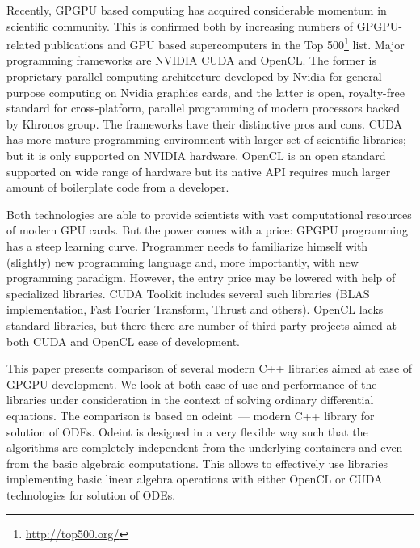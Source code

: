 \documentclass[1p]{elsarticle}
\begin{document}
Recently, GPGPU based computing has acquired considerable momentum in
scientific community. This is confirmed both by increasing numbers of
GPGPU-related publications and GPU based supercomputers in
the Top 500\footnote{\href{http://top500.org/}{http://top500.org/}} list. Major
programming frameworks are NVIDIA CUDA and OpenCL.  The former is proprietary
parallel computing architecture developed by Nvidia for general purpose
computing on Nvidia graphics cards, and the latter is open, royalty-free
standard for cross-platform, parallel programming of modern processors backed
by Khronos group. The frameworks have their distinctive pros and cons. CUDA has
more mature programming environment with larger set of scientific libraries;
but it is only supported on NVIDIA hardware. OpenCL is an open standard
supported on wide range of hardware but its native API requires much larger
amount of boilerplate code from a developer.

Both technologies are able to provide scientists with vast computational
resources of modern GPU cards. But the power comes with a price: GPGPU
programming has a steep learning curve. Programmer needs to familiarize
himself with (slightly) new programming language and, more importantly, with
new programming paradigm. However, the entry price may be lowered with help of
specialized libraries. CUDA Toolkit includes several such libraries (BLAS
implementation, Fast Fourier Transform, Thrust and others). OpenCL lacks
standard libraries, but there there are number of third party projects aimed at
both CUDA and OpenCL ease of development.

This paper presents comparison of several modern C++ libraries aimed at ease of
GPGPU development. We look at both ease of use and performance of the libraries
under consideration in the context of solving ordinary differential equations.
The comparison is based on odeint~--- modern C++ library for solution of ODEs.
Odeint is designed in a very flexible way such that the algorithms are
completely independent from the underlying containers and even from the basic
algebraic computations. This allows to effectively use libraries implementing
basic linear algebra operations with either OpenCL or CUDA technologies for
solution of ODEs.
\end{document}

